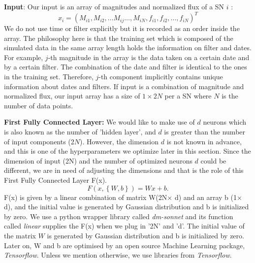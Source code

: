 \documentclass[useamsfonts]{pasj01}
\begin{document}
{\bf Input}: Our input is an array of magnitudes and normalized flux of a SN $i$ :
\begin{equation}
      x_i = \left( M_{i1}, M_{i2}, \ldots M_{ij} \ldots , M_{iN}, f_{i1}, f_{i2}, \ldots, f_{iN} \right)^T
\end{equation}
We do not use time or filter explicitly but it is recorded as an order inside the array.  The philosophy here is that the training set which is composed of the simulated data in the same array length holds the information on filter and dates.  For example, $j$-th magnitude in the array is the data taken on a certain date and by a certain filter.  The combination of the date and filter is identical to the ones in the training set.  Therefore, $j$-th component implicitly contains unique information about dates and filters.  
If input is a combination of magnitude and normalized flux,
our input array has a size of $1\times2N$ per a SN where $N$ is the number of data points.


{\bf First Fully Connected Layer:}
We would like to make use of $d$ neurons which is also known as the number of 'hidden layer', and $d$ is greater than the number of input components (2$N$).  However, the dimension $d$ is not known in advance, and this is one of the hyperparameters we optimize later in this section.  Since the dimension of input (2N) and the number of optimized neurons $d$ could be different, we are in need of adjusting the dimensions and that is the role of this First Fully Connected Layer F(x).    
\begin{equation}
    F \left(x, \left\{W,b\right\}\right) = W x + b.
\end{equation}
F(x) is given by a linear combination of matrix W(2N$\times$ d) and an array b (1$\times$ d), and the initial value is generated by Gaussian distribution and b is initialized by zero.  We use a python wrapper library called {\it dm-sonnet} and its function called {\it linear} supplies the F(x) when we plug in '2N' and 'd'.  The initial value of the matrix $W$ is generated by Gaussian distribution and b is initialized by zero.  Later on, W and b are optimised by an open source Machine Learning package, {\it Tensorflow}.  Unless we mention otherwise, we use libraries from {\it Tensorflow}.
\end{document}

